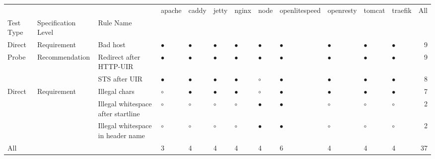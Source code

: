 \begin{tabular}{llllllllllllr}
\toprule
    &             &                                   &     apache &      caddy &      jetty &      nginx &       node & openlitespeed &  openresty &     tomcat &    traefik &  All \\
Test Type & Specification Level & Rule Name &            &            &            &            &            &               &            &            &            &      \\
\midrule
Direct & Requirement & Bad host &  $\bullet$ &  $\bullet$ &  $\bullet$ &  $\bullet$ &  $\bullet$ &     $\bullet$ &  $\bullet$ &  $\bullet$ &  $\bullet$ &    9 \\
Probe & Recommendation & Redirect after HTTP-UIR &  $\bullet$ &  $\bullet$ &  $\bullet$ &  $\bullet$ &  $\bullet$ &     $\bullet$ &  $\bullet$ &  $\bullet$ &  $\bullet$ &    9 \\
    &             & STS after UIR\rlap{*} &  $\bullet$ &  $\bullet$ &  $\bullet$ &  $\bullet$ &    $\circ$ &     $\bullet$ &  $\bullet$ &  $\bullet$ &  $\bullet$ &    8 \\
Direct & Requirement & Illegal chars &    $\circ$ &  $\bullet$ &  $\bullet$ &  $\bullet$ &    $\circ$ &     $\bullet$ &  $\bullet$ &  $\bullet$ &  $\bullet$ &    7 \\
    &             & Illegal whitespace after startline &    $\circ$ &    $\circ$ &    $\circ$ &    $\circ$ &  $\bullet$ &     $\bullet$ &    $\circ$ &    $\circ$ &    $\circ$ &    2 \\
    &             & Illegal whitespace in header name &    $\circ$ &    $\circ$ &    $\circ$ &    $\circ$ &  $\bullet$ &     $\bullet$ &    $\circ$ &    $\circ$ &    $\circ$ &    2 \\
All &             &                                   &          3 &          4 &          4 &          4 &          4 &             6 &          4 &          4 &          4 &   37 \\
\bottomrule
\end{tabular}
